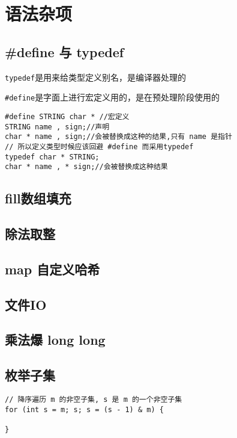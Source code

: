 \section{语法杂项}

\subsection{#define 与 typedef}
\verb|typedef|是用来给类型定义别名，是编译器处理的

\verb|#define|是字面上进行宏定义用的，是在预处理阶段使用的
\begin{lstlisting}
#define STRING char * //宏定义
STRING name , sign;//声明
char * name , sign;//会被替换成这种的结果,只有 name 是指针
// 所以定义类型时候应该回避 #define 而采用typedef
typedef char * STRING;
char * name , * sign;//会被替换成这种结果
\end{lstlisting}

\subsection{fill数组填充}


\subsection{除法取整}


\subsection{map 自定义哈希}


\subsection{文件IO}


\subsection{乘法爆 long long }


\subsection{枚举子集}
\begin{lstlisting}
// 降序遍历 m 的非空子集, s 是 m 的一个非空子集
for (int s = m; s; s = (s - 1) & m) {

}
\end{lstlisting}